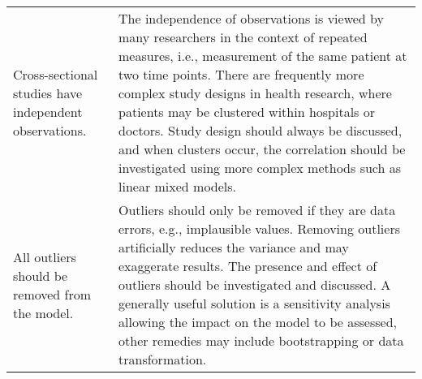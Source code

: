 \begin{table}[H]
\begin{widestuff}
\begin{tabular}{p{5cm}p{13cm}}
  Cross-sectional studies have independent observations. & The independence of observations is viewed by many researchers in the context of repeated measures, i.e., measurement of the same patient at two time points.  There are frequently more complex study designs in health research, where patients may be clustered within hospitals or doctors.  Study design should always be discussed, and when clusters occur, the correlation should be investigated using more complex methods such as linear mixed models. \\ 
  All outliers should be removed from the model. & Outliers should only be removed if they are data errors, e.g., implausible values. Removing outliers artificially reduces the variance and may exaggerate results. The presence and effect of outliers should be investigated and discussed. A generally useful solution is a sensitivity analysis allowing the impact on the model to be assessed, other remedies may include bootstrapping or data transformation. \\ 
   \bottomrule
\end{tabular}
\end{widestuff}
\end{table}

